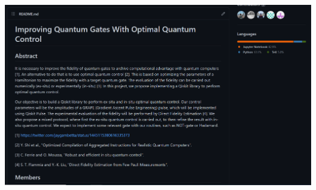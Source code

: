 \documentclass[12pt,aspectratio=169]{beamer}
\begin{document}
	\begin{frame}
	\centering
	\includegraphics[scale=0.4]{github.png}
\end{frame}

	
\end{document}
